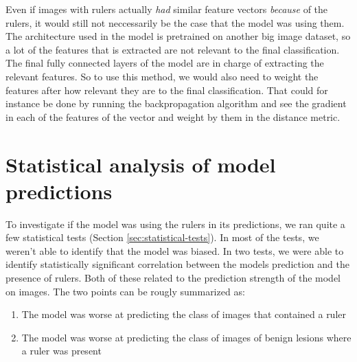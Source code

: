 Even if images with rulers actually \textit{had} similar feature vectors \textit{because} of the rulers,
it would still not neccessarily be the case that the model was using them.
The architecture used in the model is pretrained on another big image dataset,
so a lot of the features that is extracted are not relevant to the final classification. 
The final fully connected layers of the model are in charge of extracting the relevant features.
So to use this method, we would also need to weight the features after how relevant they are to
the final classification.
That could for instance be done by running the backpropagation algorithm and see the
gradient in each of the features of the vector and weight by them in the distance metric.

\section{Statistical analysis of model predictions}
To investigate if the model was using the rulers in its predictions, 
we ran quite a few statistical tests (Section \ref{sec:statistical-tests}).
In most of the tests, we weren't able to identify that the model was biased.
In two tests, we were able to identify statistically significant correlation between
the models prediction and the presence of rulers.
Both of these related to the prediction strength of the model on images.
The two points can be rougly summarized as:
\begin{enumerate}
    \item The model was worse at predicting the class of images that contained a ruler
    \item The model was worse at predicting the class of images of benign lesions where a ruler was present 
\end{enumerate}

